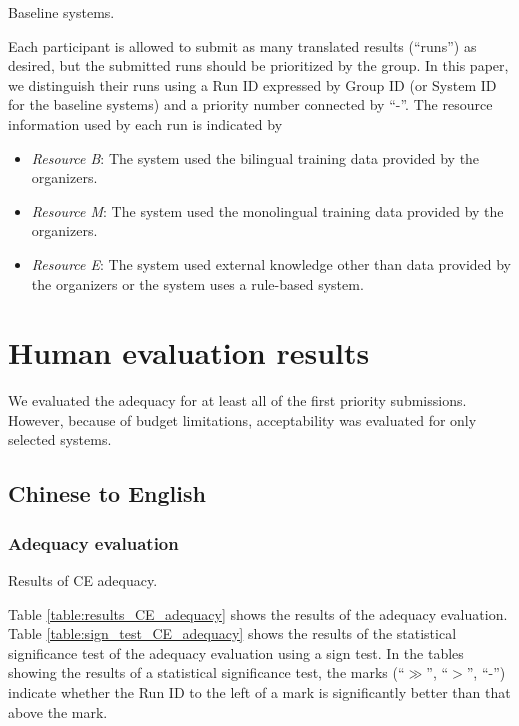 \documentclass[english]{jnlp_1.4}
\begin{document}
\begin{table}[b]
\caption{Baseline systems.}
\label{table:baseline_system}

\end{table}

Each participant is allowed to submit as many translated results (``runs'') as desired, but the submitted runs should be prioritized by the group.
In this paper, we distinguish their runs using a Run ID expressed by Group ID (or System ID for the baseline systems) and a priority number connected by ``-''.
The resource information used by each run is indicated by 
\begin{itemize} 
\item \textit{Resource B}: The system used the bilingual training data provided by the organizers. 
\item \textit{Resource M}: The system used the monolingual training data provided by the organizers. 
\item \textit{Resource E}: The system used external knowledge other than data provided by the organ\-izers or the system uses a rule-based system.
\end{itemize}






\section{Human evaluation results}
\label{sec:human_evaluation_results}

We evaluated the adequacy for at least all of the first priority submissions. 
However, because of budget limitations, acceptability was evaluated for only selected systems. 


\subsection{Chinese to English}

\subsubsection{Adequacy evaluation}

\begin{table}[b]
\caption{Results of CE adequacy.}
\label{table:results_CE_adequacy}

\end{table}

Table \ref{table:results_CE_adequacy} shows the results of the adequacy evaluation. 
Table \ref{table:sign_test_CE_adequacy} shows the results of the statistical significance test of the adequacy evaluation using a sign test.
In the tables showing the results of a statistical significance test, the marks (``$\gg$'', ``$>$'', ``-'') indicate whether the Run ID to the left of a mark is significantly better than that above the mark. 
\end{document}

